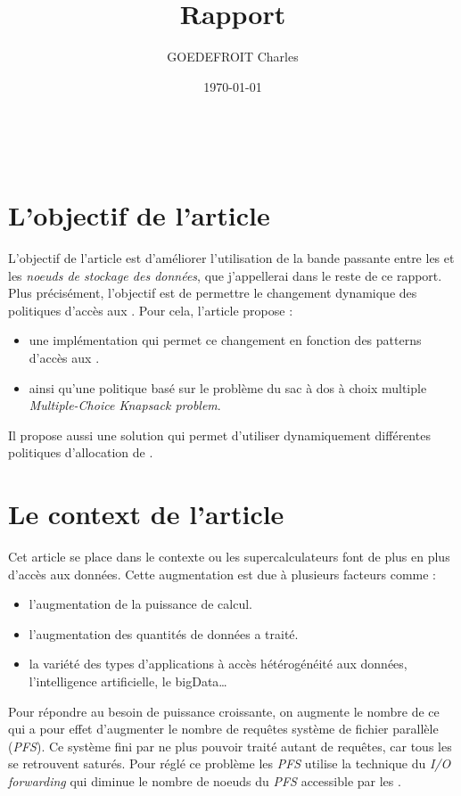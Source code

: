 \documentclass[10pt, a4paper]{article}
\title{Rapport}
\author{GOEDEFROIT Charles}
\date{\today}
\begin{document}
\begin{titlepage}
	\centering
  \ {} %
	\vfill
	\vspace{1cm}
	{\scshape\Huge\MyTitle\par}
	\vspace{0.5cm}
	{\Large\MySubject\par}
	\vspace{1cm}
	\MyAuthor
	\vfill
	{\large\MyDate\par}
\end{titlepage}

\newpage

\section{L'objectif de l'article}

L'objectif de l'article est d'améliorer l'utilisation de la bande passante entre les \noeudsDeCalculs{} et les \emph{noeuds de stockage des données}, que j'appellerai \noeudsIO{} dans le reste de ce rapport. Plus précisément, l'objectif est de permettre le changement dynamique des politiques d'accès aux \noeudsIO{}. Pour cela, l'article propose :
\begin{itemize}
  \item une implémentation qui permet ce changement en fonction des patterns d'accès aux \noeudsIO{}.
  \item ainsi qu'une politique basé sur le problème du sac à dos à choix multiple \emph{Multiple-Choice Knapsack problem}.
\end{itemize}

Il propose aussi une solution qui permet d'utiliser dynamiquement différentes politiques d'allocation de \noeudsIOforwarding{}.

\section{Le context de l'article}

Cet article se place dans le contexte ou les supercalculateurs font de plus en
plus d'accès aux données. Cette augmentation est due à plusieurs facteurs comme :
\begin{itemize}
  \item l'augmentation de la puissance de calcul.
  \item l'augmentation des quantités de données a traité.
  \item la variété des types d'applications à accès hétérogénéité aux données, l'intelligence artificielle, le bigData\dots
\end{itemize}
Pour répondre au besoin de puissance croissante, on augmente le nombre de \noeudsDeCalculs{} ce qui a pour effet d'augmenter le nombre de requêtes système de fichier parallèle (\emph{PFS}). Ce système fini par ne plus pouvoir traité autant de requêtes, car tous les \noeudsIO{} se retrouvent saturés. Pour réglé ce problème les \emph{PFS} utilise la technique du \emph{I/O forwarding} qui diminue le nombre de noeuds du \emph{PFS} accessible par les \noeudsDeCalculs{}.
\end{document}
